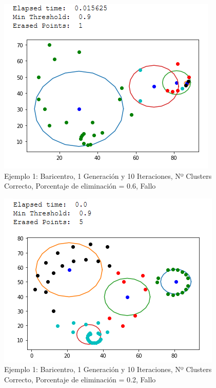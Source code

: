 \documentclass[conference,a4paper]{IEEEtran}
\begin{document}
\begin{figure}[H]
\centering
\includegraphics[scale=0.65]{Experimentacion/Ejemplo1/ej1_b_1_10_me}
\caption{Ejemplo 1: Baricentro, 1 Generación y 10 Iteraciones,  Nº Clusters Correcto, Porcentaje de eliminación = 0.6, Fallo\\}
\end{figure}

\begin{figure}[H]
\centering
\includegraphics[scale=0.65]{Experimentacion/Ejemplo1/ej1_b_1_10_le}
\caption{Ejemplo 1: Baricentro, 1 Generación y 10 Iteraciones,  Nº Clusters Correcto, Porcentaje de eliminación = 0.2, Fallo\\}
\end{figure}
\end{document}
